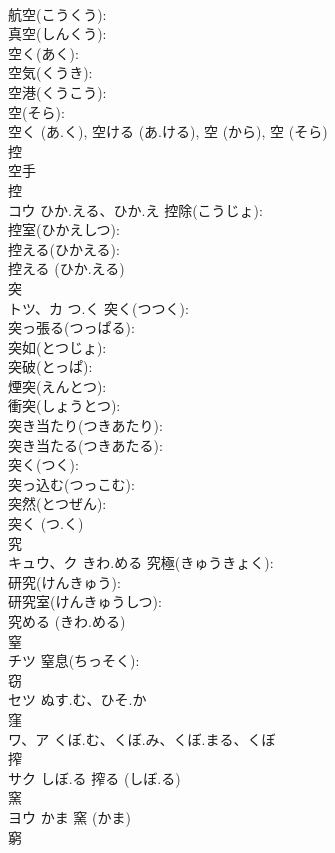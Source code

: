 \documentclass[8pt]{extreport}
\begin{document}
\begin{CJK}{UTF8}{min}
\\	航空(こうくう): 
\\	真空(しんくう): 
\\	空く(あく): 
\\	空気(くうき): 
\\	空港(くうこう): 
\\	空(そら): 
\\	空く (あ.く), 空ける (あ.ける), 空 (から), 空 (そら)
\\	控			
\\	空手 
\\	控 
\\	コウ	ひか.える、ひか.え	控除(こうじょ): 
\\	控室(ひかえしつ): 
\\	控える(ひかえる): 
\\	控える (ひか.える)
\\	突			
\\	トツ、カ	つ.く	突く(つつく): 
\\	突っ張る(つっぱる): 
\\	突如(とつじょ): 
\\	突破(とっぱ): 
\\	煙突(えんとつ): 
\\	衝突(しょうとつ): 
\\	突き当たり(つきあたり): 
\\	突き当たる(つきあたる): 
\\	突く(つく): 
\\	突っ込む(つっこむ): 
\\	突然(とつぜん): 
\\	突く (つ.く)
\\	究			
\\	キュウ、ク	きわ.める	究極(きゅうきょく): 
\\	研究(けんきゅう): 
\\	研究室(けんきゅうしつ): 
\\	究める (きわ.める)
\\	窒			
\\	チツ		窒息(ちっそく): 
\\	窃			
\\	セツ	ぬす.む、ひそ.か		
\\	窪			
\\	ワ、ア	くぼ.む、くぼ.み、くぼ.まる、くぼ		
\\	搾			
\\	サク	しぼ.る		搾る (しぼ.る)
\\	窯			
\\	ヨウ	かま		窯 (かま)
\\	窮			

\end{CJK}
\end{document}
